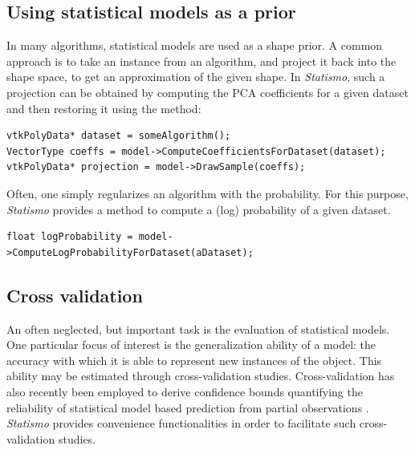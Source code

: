 \documentclass{InsightArticle}
\newcommand{\Statismo}{\emph{Statismo}\xspace}
\begin{document}
\subsection{Using statistical models as  a prior}
In many algorithms, statistical models are used as a shape prior. 
A common approach is to take an instance from an algorithm, and project it back into the 
shape space, to get an approximation of the given shape. In \Statismo, such a projection can be
obtained by computing the PCA coefficients for a given dataset and then restoring it using the 
 method:
\begin{verbatim}
vtkPolyData* dataset = someAlgorithm();
VectorType coeffs = model->ComputeCoefficientsForDataset(dataset);
vtkPolyData* projection = model->DrawSample(coeffs);
\end{verbatim}
Often, one simply regularizes an algorithm with the probability. For this purpose, \Statismo 
provides a method to compute a (log) probability of a given dataset. 
\begin{verbatim}
float logProbability = model->ComputeLogProbabilityForDataset(aDataset);
\end{verbatim}

\subsection{Cross validation}
An often neglected, but important task is the evaluation of
statistical models. One particular focus of interest is the
generalization ability of a model: the accuracy with which it is able to represent new instances of the object. 
This ability may be estimated through cross-validation studies. Cross-validation has also recently been employed
to derive confidence bounds quantifying the reliability of statistical model based prediction from partial observations \cite{Remi, confidence region}. \Statismo provides convenience functionalities in order to facilitate such cross-validation studies. 
\end{document}
